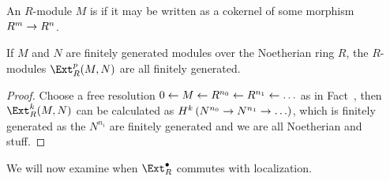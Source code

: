 \documentclass[a4paper,parskip=half,numbers=enddot, DIV=12]{scrreprt}
\begin{document}
\begin{defi}
	An $R$-module $M$ is  if it may be written as a cokernel of some morphism $R^m\morphism R^n$.
\end{defi}
\begin{fact}
	If $M$ and $N$ are finitely generated modules over the Noetherian ring $R$, the $R$-modules $\Ext_R^p(M,N)$ are all finitely generated.
\end{fact}
\begin{proof}
	Choose a free resolution $0\lmorphism M\lmorphism R^{n_0}\lmorphism R^{n_1}\lmorphism\ldots$ as in Fact~, then $\Ext_R^k(M,N)$ can be calculated as $H^k\left(N^{n_0}\morphism N^{n_1}\morphism\ldots\right)$, which is finitely generated as the $N^{n_i}$ are finitely generated and we are all Noetherian and stuff.
\end{proof}
We will now examine when $\Ext_R^\bullet$ commutes with localization.
\end{document}
